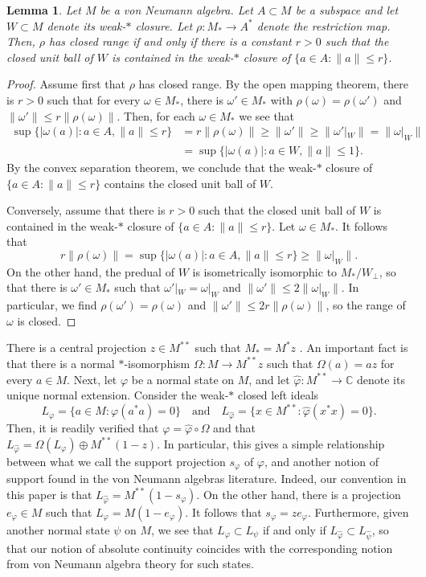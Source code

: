 \documentclass[10pt]{amsart}
\newcommand{\bC}{{\mathbb{C}}}
\renewcommand{\phi}{\varphi}
\newcommand{\qand}{\quad\text{and}\quad}
\newtheorem{lemma}{Lemma}[section]
\theoremstyle{definition}
\begin{document}
\begin{lemma}\label{L:Henkinclosed}
Let $M$ be a von Neumann algebra. Let $A\subset M$ be a subspace and let $W\subset M$ denote its weak-$*$ closure. Let $\rho:M_*\to A^*$ denote the restriction map. Then, $\rho$ has closed range if and only if there is a constant $r>0$ such that the closed unit ball of $W$ is contained in the weak-$*$ closure of $\{a\in A:\|a\|\leq r\}$.
\end{lemma}
\begin{proof}
Assume first that $\rho$ has closed range.  By the open mapping theorem,  there is $r>0$ such that for every $\omega\in M_*$, there is $\omega'\in M_*$ with $\rho(\omega)=\rho(\omega')$ and  $\|\omega'\|\leq r\|\rho(\omega)\|$. Then, for each $\omega\in M_*$ we see that
\begin{align*}
\sup\{|\omega(a)|:a\in A,\|a\|\leq r\}&=r \|\rho(\omega)\|\geq \|\omega'\|\geq \|\omega'|_W\|=\|\omega|_W\|\\
&=\sup\{|\omega(a)|:a\in W, \|a\|\leq 1\}.
\end{align*}
By the convex separation theorem, we conclude that the weak-$*$ closure of $\{a\in A:\|a\|\leq r\}$ contains the closed unit ball of $W$.

Conversely, assume that there is $r>0$ such that the closed unit ball of $W$ is contained in the weak-$*$ closure of $\{a\in A:\|a\|\leq r\}$. Let $\omega\in M_*$. It follows that
\[
r\|\rho(\omega)\|=\sup\{|\omega(a)|:a\in A,\|a\|\leq r\}\geq \|\omega|_W\|.
\]
On the other hand, the predual of $W$ is isometrically isomorphic to $M_*/W_\perp$, so that there is $\omega'\in M_*$ such that $\omega'|_W=\omega|_W$ and $\|\omega'\|\leq 2 \|\omega|_W\|$. In particular, we find $\rho(\omega')=\rho(\omega)$ and $\|\omega'\|\leq 2r\|\rho(\omega)\|$, so the range of $\omega$ is closed.
\end{proof}

There is a central projection $z\in M^{**}$ such that $M_*=M^* z$ \cite[Theorem III.2.14]{takesaki2002}. An important fact is that there is a normal $*$-isomorphism $\Omega: M\to M^{**}z$ such that $\Omega(a)=az$ for every $a\in M$. Next, let $\phi$ be a normal state on $M$,
and let $\widehat\phi:M^{**}\to\bC$ denote its unique normal extension. Consider the weak-$*$ closed left ideals
\[
L_\phi=\{a\in M:\phi(a^*a)=0\} \qand L_{\widehat\phi}=\{x\in M^{**}:\widehat\phi(x^*x)=0\}.
\]
Then, it is readily verified that $\phi=\widehat\phi\circ \Omega$ and that
$
L_{\widehat\phi}=\Omega(L_\phi)\oplus M^{**}(1-z).
$
In particular, this gives a simple relationship between what we call the support projection $s_\phi$  of $\phi$, and another notion of support found in the von Neumann algebras literature. 
Indeed, our convention in this paper is that
$
L_{\widehat\phi}=M^{**}(1-s_\phi).
$
On the other hand, there is a projection $e_\phi\in M$ such that $L_\phi=M(1-e_\phi)$. It follows that $s_\phi=ze_\phi$. Furthermore, given another normal state $\psi$ on $M$, we see that $L_\phi\subset L_\psi$ if and only if $L_{\widehat\phi}\subset L_{\widehat\psi}$, so that our notion of absolute continuity  coincides with the corresponding notion from von Neumann algebra theory for such states.
\end{document}
